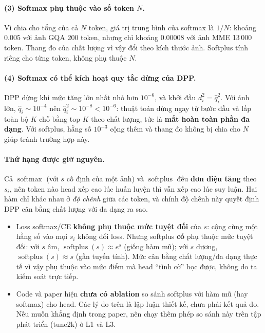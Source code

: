 \documentclass[11pt,a4paper]{article}
\newcommand{\qhat}{\hat{q}}
\newcommand{\softmax}{\operatorname{softmax}}
\newcommand{\softplus}{\operatorname{softplus}}
\begin{document}
\paragraph{(3) Softmax phụ thuộc vào số token $N$.}
Vì chia cho tổng của cả $N$ token, giá trị trung bình của softmax là $1/N$: khoảng $0.005$ với ảnh GQA 200 token, nhưng chỉ khoảng $0.00008$ với ảnh MME 13\,000 token. Thang đo của chất lượng vì vậy đổi theo kích thước ảnh. Softplus tính riêng cho từng token, không phụ thuộc $N$.

\paragraph{(4) Softmax có thể kích hoạt quy tắc dừng của DPP.}
DPP dừng khi mức tăng lớn nhất nhỏ hơn $10^{-6}$, và khởi đầu $d_i^2=\qhat_i^2$. Với ảnh lớn, $\qhat_i\sim10^{-4}$ nên $\qhat_i^2\sim10^{-8}<10^{-6}$: thuật toán dừng ngay từ bước đầu và lấp toàn bộ $K$ chỗ bằng top-$K$ theo chất lượng, tức là \textbf{mất hoàn toàn phần đa dạng}. Với softplus, hằng số $10^{-3}$ cộng thêm và thang đo không bị chia cho $N$ giúp tránh trường hợp này.

\paragraph{Thứ hạng được giữ nguyên.}
Cả $\softmax$ (với $s$ cố định của một ảnh) và $\softplus$ đều \textbf{đơn điệu tăng} theo $s_i$, nên token nào head xếp cao lúc huấn luyện thì vẫn xếp cao lúc suy luận. Hai hàm chỉ khác nhau ở \emph{độ chênh} giữa các token, và chính độ chênh này quyết định DPP cân bằng chất lượng với đa dạng ra sao.

\begin{luuy}
\begin{itemize}[leftmargin=*]
\item Loss softmax/CE \textbf{không phụ thuộc mức tuyệt đối} của $s$: cộng cùng một hằng số vào mọi $s_i$ không đổi loss. Nhưng softplus \textbf{có} phụ thuộc mức tuyệt đối: với $s$ âm, $\softplus(s)\approx e^{s}$ (giống hàm mũ); với $s$ dương, $\softplus(s)\approx s$ (gần tuyến tính). Mức cân bằng chất lượng/đa dạng thực tế vì vậy phụ thuộc vào mức điểm mà head ``tình cờ'' học được, không do ta kiểm soát trực tiếp.
\item Code và paper hiện \textbf{chưa có ablation} so sánh softplus với hàm mũ (hay softmax) cho head. Các lý do trên là lập luận thiết kế, chưa phải kết quả đo. Nếu muốn khẳng định trong paper, nên chạy thêm phép so sánh này trên tập phát triển (tune2k) ở L1 và L3.
\end{itemize}
\end{luuy}
\end{document}
